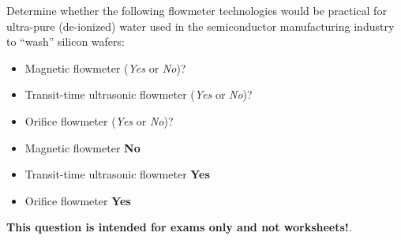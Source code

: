 

Determine whether the following flowmeter technologies would be practical for ultra-pure (de-ionized) water used in the semiconductor manufacturing industry to ``wash'' silicon wafers:

\begin{itemize}
\item{} Magnetic flowmeter ({\it Yes} or {\it No})?
\vskip 10pt
\item{} Transit-time ultrasonic flowmeter ({\it Yes} or {\it No})?
\vskip 10pt
\item{} Orifice flowmeter ({\it Yes} or {\it No})?
\end{itemize}







\begin{itemize}
\item{} Magnetic flowmeter {\bf No}
\item{} Transit-time ultrasonic flowmeter {\bf Yes}
\item{} Orifice flowmeter {\bf Yes}
\end{itemize}







{\bf This question is intended for exams only and not worksheets!}.



